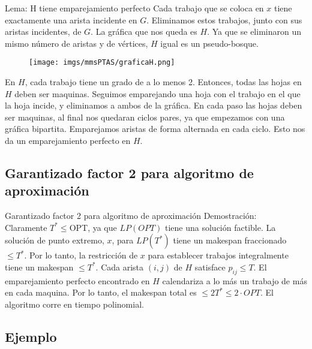 \begin{frame}{Lema: H tiene emparejamiento perfecto}
Cada trabajo que se coloca en $x$ tiene exactamente una arista incidente en $G$. Eliminamos estos trabajos, junto con sus aristas incidentes, de $G$. La gráfica que nos queda es $H$. Ya que se eliminaron un mismo número de aristas y de vértices, $H$ igual es un pseudo-bosque.
\end{frame}

\begin{frame}{}
\begin{figure}
        \texttt{[image: imgs/mmsPTAS/graficaH.png]}
    \end{figure}
\end{frame}

\begin{frame}{}
En $H$, cada trabajo tiene un grado de a lo menos 2. Entonces, todas las hojas en $H$ deben ser maquinas. Seguimos emparejando una hoja con el trabajo en el que la hoja incide, y eliminamos a ambos de la gráfica. En cada paso las hojas deben ser maquinas, al final nos quedaran ciclos pares, ya que empezamos con una gráfica bipartita. Emparejamos aristas de forma alternada en cada ciclo. Esto nos da un emparejamiento perfecto en $H$.
\end{frame}

\renewcommand{\subsectiontitle}{Garantizado factor 2 para algoritmo de aproximación}
\subsection{\subsectiontitle}

\begin{frame}{\subsectiontitle}
Demostración:\\

\vspace{10pt}
Claramente $T^*\leq$OPT, ya que $LP(OPT)$ tiene una solución factible. La solución de punto extremo, $x$, para $LP(T^*)$ tiene un makespan fraccionado $\leq T^*$. Por lo tanto, la restricción de $x$ para establecer trabajos integralmente tiene un makespan $\leq T^*$. Cada arista $(i,j)$ de $H$ satisface $p_{ij}\leq T$. El emparejamiento perfecto encontrado en $H$ calendariza a lo más un trabajo de más en cada maquina. Por lo tanto, el makespan total es $\leq 2T^* \leq 2 \cdot OPT$. El algoritmo corre en tiempo polinomial.
\end{frame}

\renewcommand{\subsectiontitle}{Ejemplo}
\subsection{\subsectiontitle}

